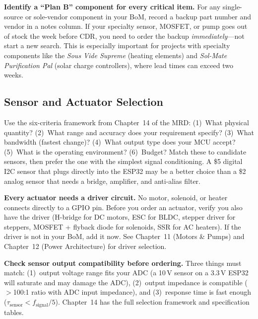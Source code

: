 \documentclass[11pt,letterpaper]{article}
\begin{document}
\begin{tipbox}
\textbf{Identify a ``Plan B'' component for every critical item.} For any single-source or sole-vendor component in your BoM, record a backup part number and vendor in a notes column. If your specialty sensor, MOSFET, or pump goes out of stock the week before CDR, you need to order the backup \textit{immediately}---not start a new search. This is especially important for projects with specialty components like the \textit{Sous Vide Supreme} (heating elements) and \textit{Sol-Mate Purification Pal} (solar charge controllers), where lead times can exceed two weeks.
\end{tipbox}

\subsection{Sensor and Actuator Selection}

\begin{faqbox}
Use the six-criteria framework from Chapter~14 of the MRD: (1)~What physical quantity? (2)~What range and accuracy does your requirement specify? (3)~What bandwidth (fastest change)? (4)~What output type does your MCU accept? (5)~What is the operating environment? (6)~Budget? Match these to candidate sensors, then prefer the one with the simplest signal conditioning. A \$5 digital I2C sensor that plugs directly into the ESP32 may be a better choice than a \$2 analog sensor that needs a bridge, amplifier, and anti-alias filter.
\end{faqbox}

\begin{warnbox}
\textbf{Every actuator needs a driver circuit.} No motor, solenoid, or heater connects directly to a GPIO pin. Before you order an actuator, verify you also have the driver (H-bridge for DC motors, ESC for BLDC, stepper driver for steppers, MOSFET + flyback diode for solenoids, SSR for AC heaters). If the driver is not in your BoM, add it now. See Chapter~11 (Motors \& Pumps) and Chapter~12 (Power Architecture) for driver selection.
\end{warnbox}

\begin{tipbox}
\textbf{Check sensor output compatibility before ordering.} Three things must match: (1)~output voltage range fits your ADC (a 10\,V sensor on a 3.3\,V ESP32 will saturate and may damage the ADC), (2)~output impedance is compatible ($>$100:1 ratio with ADC input impedance), and (3)~response time is fast enough ($\tau_{\text{sensor}} < f_{\text{signal}}/5$). Chapter~14 has the full selection framework and specification tables.
\end{tipbox}
\end{document}
